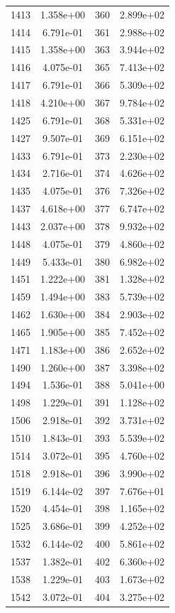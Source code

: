 \documentclass[12pt]{article}
\begin{document}
\begin{longtable}{@{}cccc@{}}
1413 & 1.358e+00 & 360 & 2.899e+02 \\
1414 & 6.791e-01 & 361 & 2.988e+02 \\
1415 & 1.358e+00 & 363 & 3.944e+02 \\
1416 & 4.075e-01 & 365 & 7.413e+02 \\
1417 & 6.791e-01 & 366 & 5.309e+02 \\
1418 & 4.210e+00 & 367 & 9.784e+02 \\
1425 & 6.791e-01 & 368 & 5.331e+02 \\
1427 & 9.507e-01 & 369 & 6.151e+02 \\
1433 & 6.791e-01 & 373 & 2.230e+02 \\
1434 & 2.716e-01 & 374 & 4.626e+02 \\
1435 & 4.075e-01 & 376 & 7.326e+02 \\
1437 & 4.618e+00 & 377 & 6.747e+02 \\
1443 & 2.037e+00 & 378 & 9.932e+02 \\
1448 & 4.075e-01 & 379 & 4.860e+02 \\
1449 & 5.433e-01 & 380 & 6.982e+02 \\
1451 & 1.222e+00 & 381 & 1.328e+02 \\
1459 & 1.494e+00 & 383 & 5.739e+02 \\
1462 & 1.630e+00 & 384 & 2.903e+02 \\
1465 & 1.905e+00 & 385 & 7.452e+02 \\
1471 & 1.183e+00 & 386 & 2.652e+02 \\
1490 & 1.260e+00 & 387 & 3.398e+02 \\
1494 & 1.536e-01 & 388 & 5.041e+00 \\
1498 & 1.229e-01 & 391 & 1.128e+02 \\
1506 & 2.918e-01 & 392 & 3.731e+02 \\
1510 & 1.843e-01 & 393 & 5.539e+02 \\
1514 & 3.072e-01 & 395 & 4.760e+02 \\
1518 & 2.918e-01 & 396 & 3.990e+02 \\
1519 & 6.144e-02 & 397 & 7.676e+01 \\
1520 & 4.454e-01 & 398 & 1.165e+02 \\
1525 & 3.686e-01 & 399 & 4.252e+02 \\
1532 & 6.144e-02 & 400 & 5.861e+02 \\
1537 & 1.382e-01 & 402 & 6.360e+02 \\
1538 & 1.229e-01 & 403 & 1.673e+02 \\
1542 & 3.072e-01 & 404 & 3.275e+02 \\

\end{longtable}
\end{document}
